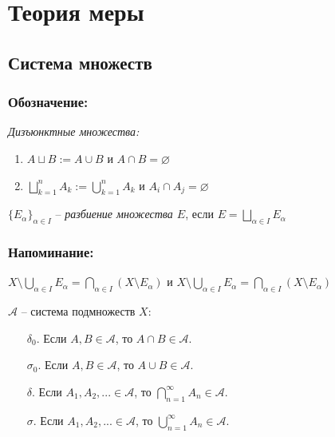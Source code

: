 \setcounter{section}{8}
\section{Теория меры}

\subsection{Система множеств}

\subsubsection*{Обозначение:}

\textit{Дизъюнктные множества:} 
\begin{enumerate}
    \item $A \sqcup B := A \cup B$ и $A \cap B = \varnothing$
    \item $\bigsqcup\limits_{k=1}^n A_k := \bigcup\limits_{k=1}^n A_k$ и $A_i \cap A_j = \varnothing$
\end{enumerate}

\begin{definition}
    $\{E_\alpha\}_{\alpha\in I}$ – \textit{разбиение множества $E$}, если $E = \bigsqcup\limits_{\alpha\in I} E_\alpha$
\end{definition}

\subsubsection*{Напоминание:}

$X \setminus  \bigcup\limits_{\alpha \in I} E_\alpha = \bigcap\limits_{\alpha \in I} (X\setminus E_\alpha)$ и 
$X \setminus  \bigcup\limits_{\alpha \in I} E_\alpha = \bigcap\limits_{\alpha \in I} (X\setminus E_\alpha)$

\begin{definition}
    $\mathcal{A}$ – система подмножеств $X$:
    \begin{enumerate}
        \item[$\delta_0$.] Если $A, B\in \mathcal{A}$, то $A\cap B\in \mathcal{A}$.
        \item[$\sigma_0$.] Если $A, B\in \mathcal{A}$, то $A\cup B\in \mathcal{A}$.
        \item[$\delta$.] Если $A_1, A_2, ...\in \mathcal{A}$, то $\bigcap\limits_{n = 1}^\infty A_n\in \mathcal{A}$.
        \item[$\sigma$.] Если $A_1, A_2, ...\in \mathcal{A}$, то $\bigcup\limits_{n = 1}^\infty A_n\in \mathcal{A}$.
    \end{enumerate}
\end{definition}

